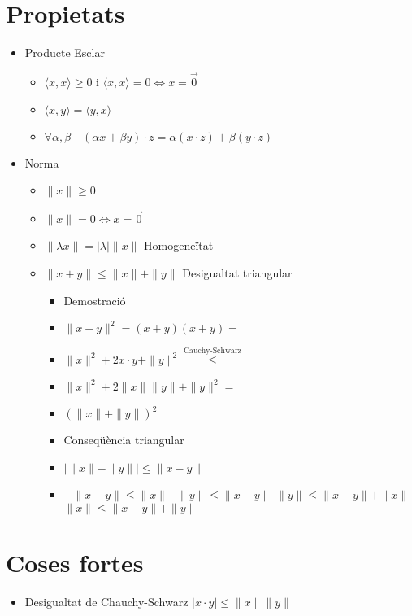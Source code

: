 \documentclass{article}
\newcommand{\prodEscalar}[2]{\langle#1, #2\rangle}
\begin{document}
\section{Propietats}
\begin{itemize}
\item Producte Esclar
	\begin{itemize}
	\item $\prodEscalar{x}{x} \ge 0$ i $\prodEscalar{x}{x} = 0 \Leftrightarrow x = \vec0$
	\item $\prodEscalar{x}{y} = \prodEscalar{y}{x}$
	\item $\forall \alpha, \beta\quad (\alpha x + \beta y)\cdot z = \alpha(x\cdot z) + \beta(y\cdot z)$
	\end{itemize}
\item Norma
	\begin{itemize}
	\item $\|x\| \ge 0$
	\item $\|x\| = 0 \Leftrightarrow x = \vec 0$
	\item $\|\lambda x\| = |\lambda|\|x\|$ Homogeneïtat
	\item $\|x + y\| \le \|x\| + \|y\|$ Desigualtat triangular
		\begin{itemize}
		\item Demostració
		\item $\|x + y\|^2 = (x + y)(x + y) =$
		\item $\|x\|^2 + 2x\cdot y + \|y\|^2 \overset{\text{Cauchy-Schwarz}}{\le}$
		\item $\|x\|^2 + 2\|x\|\|y\| + \|y\|^2 = $
		\item $(\|x\| + \|y\|)^2$
		\item Conseqüència triangular
		\item $|\|x\|-\|y\|| \le \|x - y\|$
		\item $-\|x-y\| \le \|x\| - \|y\| \le \|x - y\|$
			\subitem $\|y\| \le \|x - y\| + \|x\|$
			\subitem $\|x\| \le \|x - y\| + \|y\|$
		\end{itemize}
	\end{itemize}
\end{itemize}

\section{Coses fortes}
\begin{itemize}
\item Desigualtat de Chauchy-Schwarz
	\subitem $|x\cdot y| \le \|x\|\|y\|$
\end{itemize}
\end{document}
